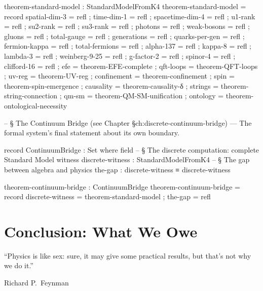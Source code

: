 \documentclass[11pt,a4paper]{book}
\begin{document}
\begin{code}
  theorem-standard-model : StandardModelFromK4
  theorem-standard-model = record
    { spatial-dim-3   = refl
    ; time-dim-1      = refl
    ; spacetime-dim-4 = refl
    ; u1-rank         = refl
    ; su2-rank        = refl
    ; su3-rank        = refl
    ; photons         = refl
    ; weak-bosons     = refl
    ; gluons          = refl
    ; total-gauge     = refl
    ; generations     = refl
    ; quarks-per-gen  = refl
    ; fermion-kappa   = refl
    ; total-fermions  = refl
    ; alpha-137       = refl
    ; kappa-8         = refl
    ; lambda-3        = refl
    ; weinberg-9-25   = refl
    ; g-factor-2      = refl
    ; spinor-4        = refl
    ; clifford-16     = refl
    ; efe             = theorem-EFE-complete
    ; qft-loops       = theorem-QFT-loops
    ; uv-reg          = theorem-UV-reg
    ; confinement     = theorem-confinement
    ; spin            = theorem-spin-emergence
    ; causality       = theorem-causality-δ
    ; strings         = theorem-string-connection
    ; qm-sm           = theorem-QM-SM-unification
    ; ontology        = theorem-ontological-necessity }

-- § The Continuum Bridge (see Chapter §ch:discrete-continuum-bridge) — The formal system's final statement about its own boundary.

record ContinuumBridge : Set where
  field
    -- § The discrete computation: complete Standard Model witness
    discrete-witness : StandardModelFromK4
    -- § The gap between algebra and physics
    the-gap          : discrete-witness ≡ discrete-witness

theorem-continuum-bridge : ContinuumBridge
theorem-continuum-bridge = record
  { discrete-witness = theorem-standard-model
  ; the-gap          = refl }
\end{code}


\chapter*{Conclusion: What We Owe}
\label{ch:conclusion}

\epigraph{``Physics is like sex: sure, it may give some practical results, but that's not why we do it.''}{Richard P.~Feynman}

\bigskip
\end{document}
